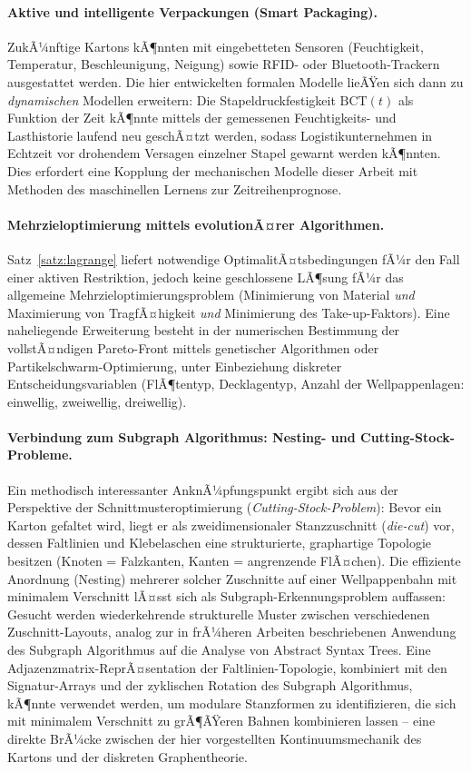 ﻿\documentclass[a4paper,12pt]{article}
\theoremstyle{definition}
\begin{document}
\paragraph{Aktive und intelligente Verpackungen (Smart Packaging).}
ZukÃ¼nftige Kartons kÃ¶nnten mit eingebetteten Sensoren (Feuchtigkeit,
Temperatur, Beschleunigung, Neigung) sowie RFID- oder Bluetooth-Trackern
ausgestattet werden. Die hier entwickelten formalen Modelle lieÃŸen sich dann zu
\emph{dynamischen} Modellen erweitern: Die Stapeldruckfestigkeit
$\mathrm{BCT}(t)$ als Funktion der Zeit kÃ¶nnte mittels der gemessenen
Feuchtigkeits- und Lasthistorie laufend neu geschÃ¤tzt werden, sodass
Logistikunternehmen in Echtzeit vor drohendem Versagen einzelner Stapel gewarnt
werden kÃ¶nnten. Dies erfordert eine Kopplung der mechanischen Modelle dieser
Arbeit mit Methoden des maschinellen Lernens zur Zeitreihenprognose.

\paragraph{Mehrzieloptimierung mittels evolutionÃ¤rer Algorithmen.}
Satz~\ref{satz:lagrange} liefert notwendige OptimalitÃ¤tsbedingungen fÃ¼r den Fall
einer aktiven Restriktion, jedoch keine geschlossene LÃ¶sung fÃ¼r das allgemeine
Mehrzieloptimierungsproblem (Minimierung von Material \emph{und} Maximierung von
TragfÃ¤higkeit \emph{und} Minimierung des Take-up-Faktors). Eine naheliegende
Erweiterung besteht in der numerischen Bestimmung der vollstÃ¤ndigen
Pareto-Front mittels genetischer Algorithmen oder Partikelschwarm-Optimierung,
unter Einbeziehung diskreter Entscheidungsvariablen (FlÃ¶tentyp, Decklagentyp,
Anzahl der Wellpappenlagen: einwellig, zweiwellig, dreiwellig).

\paragraph{Verbindung zum Subgraph Algorithmus: Nesting- und Cutting-Stock-Probleme.}
Ein methodisch interessanter AnknÃ¼pfungspunkt ergibt sich aus der Perspektive
der Schnittmusteroptimierung (\emph{Cutting-Stock-Problem}): Bevor ein Karton
gefaltet wird, liegt er als zweidimensionaler Stanzzuschnitt (\emph{die-cut})
vor, dessen Faltlinien und Klebelaschen eine strukturierte, graphartige Topologie
besitzen (Knoten = Falzkanten, Kanten = angrenzende FlÃ¤chen). Die effiziente
Anordnung (Nesting) mehrerer solcher Zuschnitte auf einer Wellpappenbahn mit
minimalem Verschnitt lÃ¤sst sich als Subgraph-Erkennungsproblem auffassen:
Gesucht werden wiederkehrende strukturelle Muster zwischen verschiedenen
Zuschnitt-Layouts, analog zur in frÃ¼heren Arbeiten beschriebenen Anwendung des
Subgraph Algorithmus auf die Analyse von Abstract Syntax Trees. Eine
Adjazenzmatrix-ReprÃ¤sentation der Faltlinien-Topologie, kombiniert mit den
Signatur-Arrays und der zyklischen Rotation des Subgraph Algorithmus, kÃ¶nnte
verwendet werden, um modulare Stanzformen zu identifizieren, die sich mit
minimalem Verschnitt zu grÃ¶ÃŸeren Bahnen kombinieren lassen -- eine direkte
BrÃ¼cke zwischen der hier vorgestellten Kontinuumsmechanik des Kartons und der
diskreten Graphentheorie.
\end{document}
